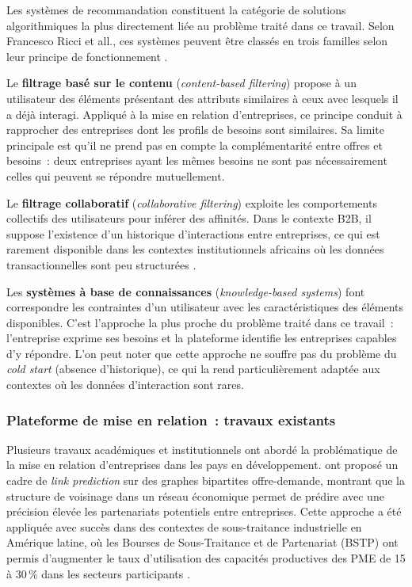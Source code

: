 \documentclass[12pt, a4paper, oneside]{report}
\begin{document}
Les syst\`emes de recommandation constituent la cat\'egorie de
solutions algorithmiques la plus directement li\'ee au probl\`eme
trait\'e dans ce travail. Selon Francesco Ricci et all., ces syst\`emes
peuvent \^etre class\'es en trois familles selon leur principe de
fonctionnement \cite{ricci_2015}.

Le \textbf{filtrage bas\'e sur le contenu} (\textit{content-based
	filtering}) propose \`a un utilisateur des \'el\'ements pr\'esentant
des attributs similaires \`a ceux avec lesquels il a d\'ej\`a
interagi. Appliqu\'e \`a la mise en relation d'entreprises, ce
principe conduit \`a rapprocher des entreprises dont les profils
de besoins sont similaires. Sa limite principale est qu'il ne prend
pas en compte la compl\'ementarit\'e entre offres et besoins~: deux
entreprises ayant les m\^emes besoins ne sont pas n\'ecessairement
celles qui peuvent se r\'epondre mutuellement.

Le \textbf{filtrage collaboratif} (\textit{collaborative filtering})
exploite les comportements collectifs des utilisateurs pour inf\'erer
des affinit\'es. Dans le contexte B2B, il suppose l'existence d'un
historique d'interactions entre entreprises, ce qui est rarement
disponible dans les contextes institutionnels africains o\`u les
donn\'ees transactionnelles sont peu structur\'ees \cite{ricci_2015}.

Les \textbf{syst\`emes \`a base de connaissances}
(\textit{knowledge-based systems}) font correspondre les contraintes
d'un utilisateur avec les caract\'eristiques des \'el\'ements
disponibles. C'est l'approche la plus proche du probl\`eme trait\'e
dans ce travail~: l'entreprise exprime ses besoins et la plateforme
identifie les entreprises capables d'y r\'epondre. L'on peut
noter que cette approche ne souffre pas du probl\`eme du
\textit{cold start} (absence d'historique), ce qui la rend
particuli\`erement adapt\'ee aux contextes o\`u les donn\'ees
d'interaction sont rares.

\subsubsection{Plateforme de mise en relation~:
	travaux existants}

Plusieurs travaux acad\'emiques et institutionnels ont abord\'e la
probl\'ematique de la mise en relation d'entreprises dans les pays
en d\'eveloppement. \cite{lu_zhou_2011} ont propos\'e un cadre de
\textit{link prediction} sur des graphes bipartites offre-demande,
montrant que la structure de voisinage dans un r\'eseau \'economique
permet de pr\'edire avec une pr\'ecision \'elev\'ee les partenariats
potentiels entre entreprises. Cette approche a \'et\'e appliqu\'ee
avec succ\`es dans des contextes de sous-traitance industrielle en
Am\'erique latine, o\`u les Bourses de Sous-Traitance et de
Partenariat (BSTP) ont permis d'augmenter le taux d'utilisation
des capacit\'es productives des PME de 15 \`a 30\,\% dans les
secteurs participants \cite{unido_2022}.
\end{document}
